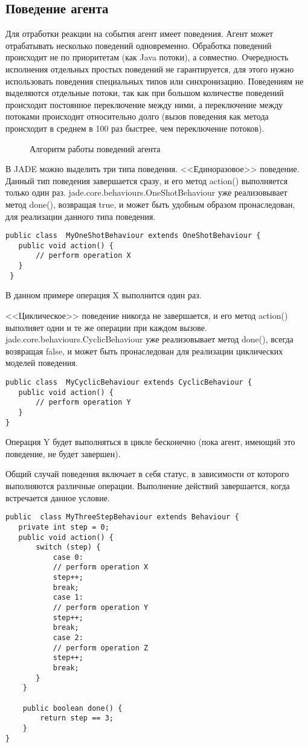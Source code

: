 \subsection{Поведение агента}
Для отработки реакции на события агент имеет поведения. Агент может отрабатывать несколько поведений одновременно. Обработка поведений происходит не по приоритетам (как Java потоки), а совместно. Очередность исполнения отдельных простых поведений не гарантируется, для этого нужно использовать поведения специальных типов или синхронизацию.
Поведениям не выделяются отдельные потоки, так как при большом количестве поведений происходит постоянное переключение между ними, а переключение между потоками происходит относительно долго (вызов поведения как метода происходит в среднем в 100 раз быстрее, чем переключение потоков).
\begin{figure}[h!]
\caption{Алгоритм работы поведений агента}
\label{2:behs}
\end{figure}
В JADE можно выделить три типа поведения.
<<Единоразовое>> поведение. Данный тип поведения завершается сразу, и его метод action() выполняется только один раз. jade.core.behaviours.OneShotBehaviour уже реализовывает метод done(), возвращая true, и может быть удобным образом пронаследован, для реализации данного типа поведения.
\begin{lstlisting}
public class  MyOneShotBehaviour extends OneShotBehaviour { 
   public void action() { 
       // perform operation X 
   } 
 }
\end{lstlisting}
В данном примере операция X выполнится один раз.

<<Циклическое>> поведение никогда не завершается, и его метод action() выполняет одни и те же операции при каждом вызове. jade.core.behaviours.CyclicBehaviour уже реализовывает метод done(), всегда возвращая false, и может быть пронаследован для реализации циклических моделей поведения.
\begin{lstlisting}
public class  MyCyclicBehaviour extends CyclicBehaviour { 
   public void action() { 
       // perform operation Y 
   } 
}
\end{lstlisting}
Операция Y будет выполняться в цикле бесконечно (пока агент, имеющий это поведение, не будет завершен).

Общий случай поведения включает в себя статус, в зависимости от которого выполняются различные операции. Выполнение действий завершается, когда встречается данное условие.
\begin{lstlisting}
public  class MyThreeStepBehaviour extends Behaviour { 
   private int step = 0; 
   public void action() { 
       switch (step) { 
           case 0: 
           // perform operation X 
           step++; 
           break; 
           case 1: 
           // perform operation Y 
           step++; 
           break; 
           case 2: 
           // perform operation Z 
           step++; 
           break; 
       } 
    } 

    public boolean done() { 
        return step == 3; 
    } 
}
\end{lstlisting}

